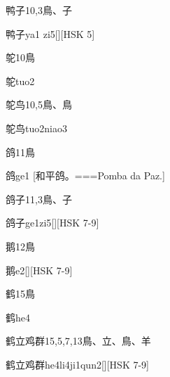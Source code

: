 \begin{Entry}{鸭子}{10,3}{⿃、⼦}
  \begin{Phonetics}{鸭子}{ya1 zi5}[][HSK 5]
  \end{Phonetics}
\end{Entry}

\begin{Entry}{鸵}{10}{⿃}
  \begin{Phonetics}{鸵}{tuo2}
  \end{Phonetics}
\end{Entry}

\begin{Entry}{鸵鸟}{10,5}{⿃、⿃}
  \begin{Phonetics}{鸵鸟}{tuo2niao3}
  \end{Phonetics}
\end{Entry}

\begin{Entry}{鸽}{11}{⿃}
  \begin{Phonetics}{鸽}{ge1}
    [和平鸽。===Pomba da Paz.]
  \end{Phonetics}
\end{Entry}

\begin{Entry}{鸽子}{11,3}{⿃、⼦}
  \begin{Phonetics}{鸽子}{ge1zi5}[][HSK 7-9]
  \end{Phonetics}
\end{Entry}

\begin{Entry}{鹅}{12}{⿃}
  \begin{Phonetics}{鹅}{e2}[][HSK 7-9]
  \end{Phonetics}
\end{Entry}

\begin{Entry}{鹤}{15}{⿃}
  \begin{Phonetics}{鹤}{he4}
  \end{Phonetics}
\end{Entry}

\begin{Entry}{鹤立鸡群}{15,5,7,13}{⿃、⽴、⿃、⽺}
  \begin{Phonetics}{鹤立鸡群}{he4li4ji1qun2}[][HSK 7-9]
  \end{Phonetics}
\end{Entry}

